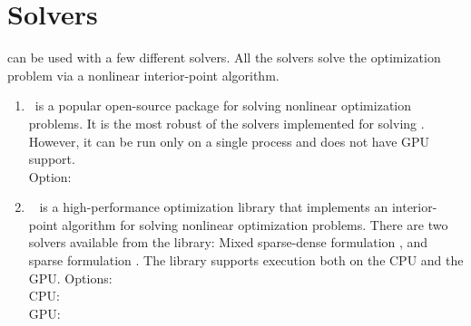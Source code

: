 \begin{comment}
\subssubection{Voltage magnitude for cartesian coordinates}
When using cartesian coordinates for voltages, inequality constraints (\ref{eq:opflow_ineq_vmag}) need to introduced to constraining the voltage magnitude within its bounds
\begin{equation}
  {\vmini}^2 \le {\vreali}^2 + {\vimagi}^2 \le {\vmaxi}^2,~~\iinJbus
\label{eq:opflow_ineq_vmag}
\end{equation}
\end{comment}

\section{Solvers}\label{sec:opflow_solvers}
\opflow can be used with a few different solvers. All the solvers solve the optimization problem via a nonlinear interior-point algorithm.
\begin{enumerate}
  \item \ipopt~is a popular open-source package for solving nonlinear optimization problems. It is the most robust of the solvers implemented for solving \opflow. However, it can be run only on a single process and does not have GPU support. \\ Option:
   

  \item \hiop~ is a high-performance optimization library that implements an interior-point algorithm for solving nonlinear optimization problems. There are two solvers available from the \hiop library: Mixed sparse-dense formulation {}, and sparse formulation {}. The library supports execution both on the CPU and the GPU. Options: \\ CPU: {} {} {} \\ GPU:  {} {} 


\end{enumerate}


